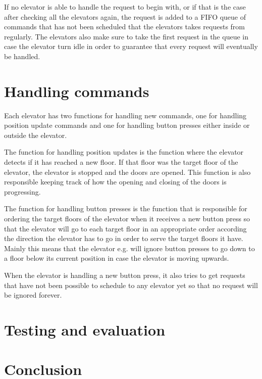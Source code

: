 \documentclass[10pt,a4paper]{article}
\begin{document}
If no elevator is able to handle the request to begin with, or if that is the case after checking all the elevators again, the request is added to a FIFO queue of commands that has not been scheduled that the elevators takes requests from regularly. The elevators also make sure to take the first request in the queue in case the elevator turn idle in order to guarantee that every request will eventually be handled.

\section{Handling commands}

Each elevator has two functions for handling new commands, one for handling position update commands and one for handling button presses either inside or outside the elevator.

The function for handling position updates is the function where the elevator detects if it has reached a new floor. If that floor was the target floor of the elevator, the elevator is stopped and the doors are opened. This function is also responsible keeping track of how the opening and closing of the doors is progressing.

The function for handling button presses is the function that is responsible for ordering the target floors of the elevator when it receives a new button press so that the elevator will go to each target floor in an appropriate order according the direction the elevator has to go in order to serve the target floors it have. Mainly this means that the elevator e.g. will ignore button presses to go down to a floor below its current position in case the elevator is moving upwards.

When the elevator is handling a new button press, it also tries to get requests that have not been possible to schedule to any elevator yet so that no request will be ignored forever.

\section{Testing and evaluation}

\section{Conclusion}
\end{document}
